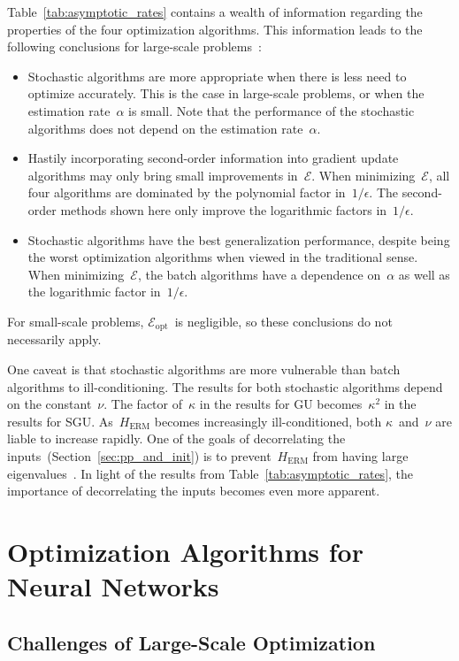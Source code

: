 \documentclass[11pt,a4paper]{article}
\numberwithin{equation}{section}
\newcommand{\opterr}{\mathcal{E}_{\mathrm{opt}}}
\begin{document}
Table~\ref{tab:asymptotic_rates} contains a wealth of information regarding the
properties of the four optimization algorithms. This information leads to the
following conclusions for large-scale problems~\citep{bousquet2008tradeoffs}:
\begin{itemize}
\item Stochastic algorithms are more appropriate when there is less need to
optimize accurately. This is the case in large-scale problems, or when the
estimation rate~$\alpha$ is small. Note that the performance of the stochastic
algorithms does not depend on the estimation rate~$\alpha$.

\item Hastily incorporating second-order information into gradient update
algorithms may only bring small improvements in~$\mathcal{E}$. When
minimizing~$\mathcal{E}$, all four algorithms are dominated by the polynomial
factor in~$1/\epsilon$. The second-order methods shown here only improve the
logarithmic factors in~$1/\epsilon$.

\item Stochastic algorithms have the best generalization performance, despite
being the worst optimization algorithms when viewed in the traditional sense.
When minimizing~$\mathcal{E}$, the batch algorithms have a dependence
on~$\alpha$ as well as the logarithmic factor in~$1/\epsilon$.
\end{itemize}
For small-scale problems, $\opterr$~is negligible, so these conclusions do not
necessarily apply.

One caveat is that stochastic algorithms are more vulnerable than batch
algorithms to ill-conditioning. The results for both stochastic algorithms
depend on the constant~$\nu$. The factor of~$\kappa$ in the results for GU
becomes~$\kappa^2$ in the results for SGU. As~$H_{\text{ERM}}$ becomes
increasingly ill-conditioned, both $\kappa$~and~$\nu$ are liable to increase
rapidly. One of the goals of decorrelating the
inputs~(Section~\ref{sec:pp_and_init}) is to prevent~$H_{\text{ERM}}$ from
having large eigenvalues~\citep{lecun-98b}. In light of the results from
Table~\ref{tab:asymptotic_rates}, the importance of decorrelating the inputs
becomes even more apparent.

\section{Optimization Algorithms for Neural Networks}

\subsection{Challenges of Large-Scale Optimization}
\end{document}
